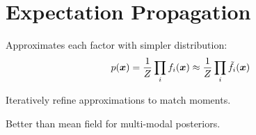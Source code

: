 
\section{Expectation Propagation}
\label{sec:ep}

Approximates each factor with simpler distribution:
\begin{equation}
p(\boldsymbol{x}) = \frac{1}{Z} \prod_i f_i(\boldsymbol{x}) \approx \frac{1}{Z} \prod_i \tilde{f}_i(\boldsymbol{x})
\end{equation}

Iteratively refine approximations to match moments.

Better than mean field for multi-modal posteriors.





